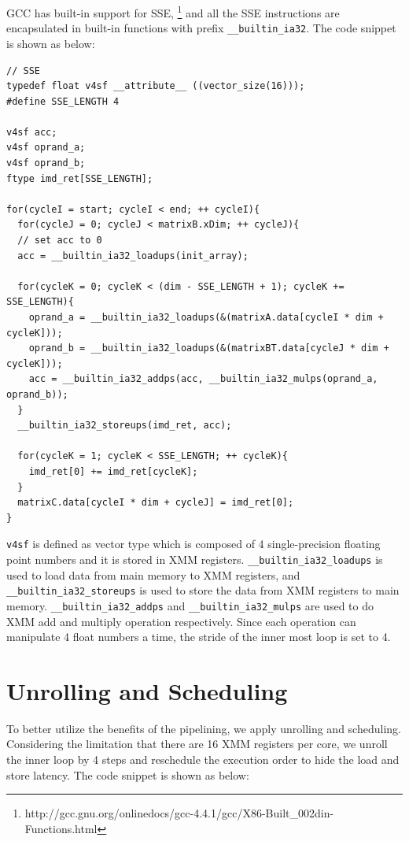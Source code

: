 \documentclass[12pt]{article}
\begin{document}
GCC has built-in support for SSE, 
\footnote{http://gcc.gnu.org/onlinedocs/gcc-4.4.1/gcc/X86-Built\_002din-Functions.html} 
and all the SSE instructions are encapsulated in built-in functions with 
prefix \texttt{\_\_builtin\_ia32}. The code snippet is shown as below:

\footnotesize
\begin{verbatim}
// SSE
typedef float v4sf __attribute__ ((vector_size(16)));
#define SSE_LENGTH 4

v4sf acc;
v4sf oprand_a;
v4sf oprand_b;
ftype imd_ret[SSE_LENGTH];

for(cycleI = start; cycleI < end; ++ cycleI){
  for(cycleJ = 0; cycleJ < matrixB.xDim; ++ cycleJ){
  // set acc to 0
  acc = __builtin_ia32_loadups(init_array);
        
  for(cycleK = 0; cycleK < (dim - SSE_LENGTH + 1); cycleK += SSE_LENGTH){
    oprand_a = __builtin_ia32_loadups(&(matrixA.data[cycleI * dim + cycleK]));
    oprand_b = __builtin_ia32_loadups(&(matrixBT.data[cycleJ * dim + cycleK]));
    acc = __builtin_ia32_addps(acc, __builtin_ia32_mulps(oprand_a, oprand_b));
  }
  __builtin_ia32_storeups(imd_ret, acc);

  for(cycleK = 1; cycleK < SSE_LENGTH; ++ cycleK){
    imd_ret[0] += imd_ret[cycleK];
  }
  matrixC.data[cycleI * dim + cycleJ] = imd_ret[0];
}
\end{verbatim}
\normalsize

\texttt{v4sf} is defined as vector type which is composed of 4 single-precision
floating point numbers and it is stored in XMM registers. 
\texttt{\_\_builtin\_ia32\_loadups} is used to load data from main memory to 
XMM registers, and \texttt{\_\_builtin\_ia32\_storeups} is used to store the 
data from XMM registers to main memory. \texttt{\_\_builtin\_ia32\_addps} and 
\texttt{\_\_builtin\_ia32\_mulps} are used to do XMM add and multiply operation 
respectively. Since each operation can manipulate 4 float numbers a time, the 
stride of the inner most loop is set to 4.

\section{Unrolling and Scheduling}
To better utilize the benefits of the pipelining, we apply unrolling and scheduling.
Considering the limitation that there are 16 XMM registers per core, we unroll the
inner loop by 4 steps and reschedule the execution order to hide the load and
store latency. The code snippet is shown as below:
\end{document}
